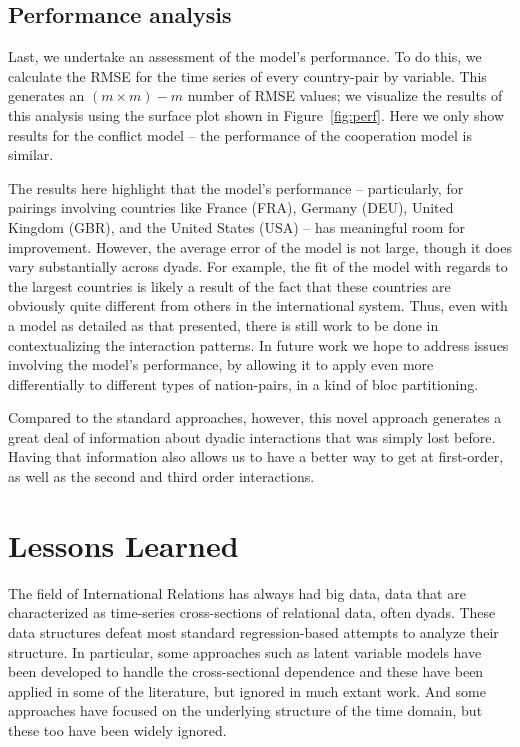\documentclass[3p,times,twocolumn,authoryear,12pt]{elsarticle}
\begin{document}
\subsection{Performance analysis}

Last, we undertake an assessment of the model's performance. To do this, we calculate the RMSE for the time series of every country-pair by variable. This generates an $(m \times m) - m$ number of RMSE values; we visualize the results of this analysis using the surface plot shown in Figure~\ref{fig:perf}. Here we only show results for the conflict model -- the performance of the cooperation model is similar. 

The results here highlight that the model's performance -- particularly, for pairings involving countries like France (FRA), Germany (DEU), United Kingdom (GBR), and the United States (USA) -- has meaningful room for improvement.  However, the average error of the model is not large, though it does vary substantially across dyads.  For example, the  fit of the model with regards to the largest countries is likely a result of the fact that these countries are obviously quite different from others in the international system. Thus, even with a model as detailed as that presented, there is still work to be done in contextualizing the interaction patterns. In future work we hope to address issues involving the model's performance, by allowing it to apply even more differentially to different types of nation-pairs, in a kind of bloc partitioning. 

Compared to the standard approaches, however, this novel approach generates a great deal of information about dyadic interactions that was simply lost before. Having that information also allows us to have a better way to get at first-order, as well as the second and third order interactions.

\section{Lessons Learned}

The field of International Relations has always had big data, data that are characterized as time-series cross-sections of relational data, often dyads. These data structures defeat most standard regression-based attempts to analyze their structure. In particular, some approaches such as latent variable models have been developed to handle the cross-sectional dependence and these have been applied in some of the literature, but ignored in much extant work. And some approaches have focused on the underlying structure of the time domain, but these too have been widely ignored. 
\end{document}
